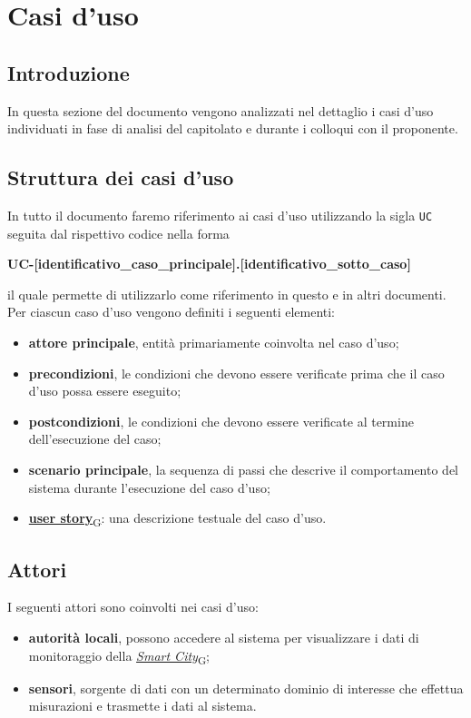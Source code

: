 \section{Casi d'uso}
\subsection{Introduzione}
In questa sezione del documento vengono analizzati nel dettaglio i casi d'uso individuati in fase di analisi del capitolato e durante i colloqui con il proponente.

\subsection{Struttura dei casi d'uso}
In tutto il documento faremo riferimento ai casi d'uso utilizzando la sigla \texttt{UC} seguita dal rispettivo codice nella forma
\begin{center}
	\textbf{UC-[identificativo\_caso\_principale].[identificativo\_sotto\_caso]}
\end{center}
il quale permette di utilizzarlo come riferimento in questo e in altri documenti.\\
Per ciascun caso d'uso vengono definiti i seguenti elementi:
\begin{itemize}
	\item \textbf{attore principale}, entità primariamente coinvolta nel caso d'uso;
	\item \textbf{precondizioni}, le condizioni che devono essere verificate prima che il caso d'uso possa essere eseguito;
	\item \textbf{postcondizioni}, le condizioni che devono essere verificate al termine dell'esecuzione del caso;
	\item \textbf{scenario principale}, la sequenza di passi che descrive il comportamento del sistema durante l'esecuzione del caso d'uso;
	\item \href{https://7last.github.io/docs/pb/documentazione-interna/glossario\#user-story}{\textbf{user story}\textsubscript{G}}: una descrizione testuale del caso d'uso.
\end{itemize}

\subsection{Attori}
I seguenti attori sono coinvolti nei casi d'uso:
\begin{itemize}
	\item \textbf{autorità locali}, possono accedere al sistema per visualizzare i dati di monitoraggio della \href{https://7last.github.io/docs/pb/documentazione-interna/glossario\#smart-city}{\textit{Smart City}\textsubscript{G}};
	\item \textbf{sensori}, sorgente di dati con un determinato dominio di interesse che effettua misurazioni e trasmette i dati al sistema.
\end{itemize}

